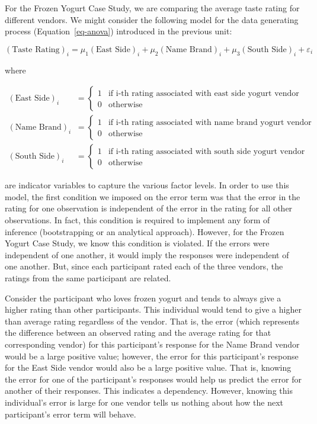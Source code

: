 \documentclass[
  letterpaper,
  DIV=11,
  numbers=noendperiod]{scrreprt}
\theoremstyle{definition}
\theoremstyle{definition}
\theoremstyle{plain}
\theoremstyle{remark}
\begin{document}
For the Frozen Yogurt Case Study, we are comparing the average taste
rating for different vendors. We might consider the following model for
the data generating process (Equation~\ref{eq-anova}) introduced in the
previous unit:

\[(\text{Taste Rating})_i = \mu_1 (\text{East Side})_i + \mu_2 (\text{Name Brand})_i + \mu_3 (\text{South Side})_i + \varepsilon_i\]

where

\[
\begin{aligned}
  (\text{East Side})_i &= \begin{cases}
    1 & \text{if i-th rating associated with east side yogurt vendor} \\
    0 & \text{otherwise}
    \end{cases} \\
  (\text{Name Brand})_i &= \begin{cases}
    1 & \text{if i-th rating associated with name brand yogurt vendor} \\
    0 & \text{otherwise}
    \end{cases} \\
  (\text{South Side})_i &= \begin{cases}
    1 & \text{if i-th rating associated with south side yogurt vendor} \\
    0 & \text{otherwise}
    \end{cases} 
\end{aligned}
\]

are indicator variables to capture the various factor levels. In order
to use this model, the first condition we imposed on the error term was
that the error in the rating for one observation is independent of the
error in the rating for all other observations. In fact, this condition
is required to implement any form of inference (bootstrapping or an
analytical approach). However, for the Frozen Yogurt Case Study, we know
this condition is violated. If the errors were independent of one
another, it would imply the responses were independent of one another.
But, since each participant rated each of the three vendors, the ratings
from the same participant are related.

Consider the participant who loves frozen yogurt and tends to always
give a higher rating than other participants. This individual would tend
to give a higher than average rating regardless of the vendor. That is,
the error (which represents the difference between an observed rating
and the average rating for that corresponding vendor) for this
participant's response for the Name Brand vendor would be a large
positive value; however, the error for this participant's response for
the East Side vendor would also be a large positive value. That is,
knowing the error for one of the participant's responses would help us
predict the error for another of their responses. This indicates a
dependency. However, knowing this individual's error is large for one
vendor tells us nothing about how the next participant's error term will
behave.
\end{document}
